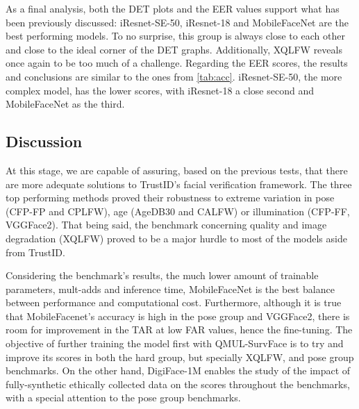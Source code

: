 \documentclass[class=report, crop=false, a4paper, 12pt]{standalone}
\begin{document}
As a final analysis, both the DET plots and the EER values support what has been previously discussed: iResnet-SE-50, iResnet-18 and MobileFaceNet are the best performing models. To no surprise, this group is always close to each other and close to the ideal corner of the DET graphs. Additionally, XQLFW reveals once again to be too much of a challenge. Regarding the EER scores, the results and conclusions are similar to the ones from \autoref{tab:acc}. iResnet-SE-50, the more complex model, has the lower scores, with iResnet-18 a close second and MobileFaceNet as the third.


\subsection{Discussion}
\par At this stage, we are capable of assuring, based on the previous tests, that there are more adequate solutions to TrustID's facial verification framework. The three top performing methods proved their robustness to extreme variation in pose (CFP-FP and CPLFW), age (AgeDB30 and CALFW) or illumination (CFP-FF, VGGFace2). That being said, the benchmark concerning quality and image degradation (XQLFW) proved to be a major hurdle to most of the models aside from TrustID.

\par Considering the benchmark's results, the much lower amount of trainable parameters, mult-adds and inference time, MobileFaceNet is the best balance between performance and computational cost. Furthermore, although it is true that MobileFacenet's accuracy is high in the pose group and VGGFace2, there is room for improvement in the TAR at low FAR values, hence the fine-tuning. The objective of further training the model first with QMUL-SurvFace is to try and improve its scores in both the hard group, but specially XQLFW, and pose group benchmarks. On the other hand, DigiFace-1M enables the study of the impact of fully-synthetic ethically collected data on the scores throughout the benchmarks, with a special attention to the pose group benchmarks. 
\end{document}
